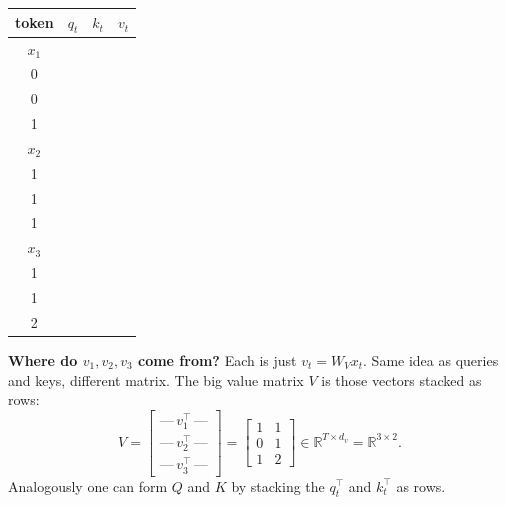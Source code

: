 \documentclass[11pt]{article}
\begin{document}
\begin{center}
\begin{tabular}{@{}cccc@{}}
\toprule
token & \(q_t\) & \(k_t\) & \(v_t\) \\
\midrule
\(x_1\) & \(\begin{bmatrix}1\\0\end{bmatrix}\)
        & \(\begin{bmatrix}1\\0\end{bmatrix}\)
        & \(\begin{bmatrix}1\\1\end{bmatrix}\) \\[1.2em]
\(x_2\) & \(\begin{bmatrix}0\\1\end{bmatrix}\)
        & \(\begin{bmatrix}1\\1\end{bmatrix}\)
        & \(\begin{bmatrix}0\\1\end{bmatrix}\) \\[1.2em]
\(x_3\) & \(\begin{bmatrix}1\\1\end{bmatrix}\)
        & \(\begin{bmatrix}2\\1\end{bmatrix}\)
        & \(\begin{bmatrix}1\\2\end{bmatrix}\) \\
\bottomrule
\end{tabular}
\end{center}

\noindent\textbf{Where do \(v_1,v_2,v_3\) come from?}
Each is just \(v_t = W_V x_t\). Same idea as queries and keys, different matrix.
The big value matrix \(V\) is those vectors stacked as rows:
\[
  V =
  \begin{bmatrix}
    \text{---}\, v_1^\top\, \text{---} \\
    \text{---}\, v_2^\top\, \text{---} \\
    \text{---}\, v_3^\top\, \text{---}
  \end{bmatrix}
  =
  \begin{bmatrix}
    1 & 1 \\
    0 & 1 \\
    1 & 2
  \end{bmatrix}
  \in \mathbb{R}^{T \times d_v}
  = \mathbb{R}^{3\times 2}.
\]
Analogously one can form \(Q\) and \(K\) by stacking the \(q_t^\top\) and
\(k_t^\top\) as rows.
\end{document}

